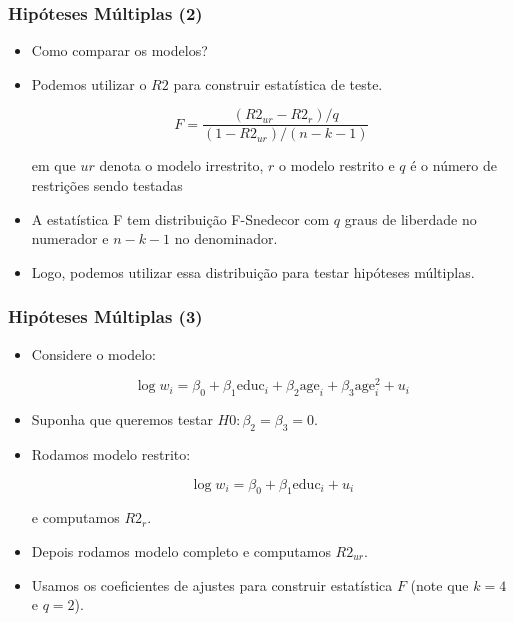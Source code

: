 \documentclass[10pt,slides,xcolor=pdftex,dvipsnames,table]{beamer}
\begin{document}

\begin{frame}[fragile]
	\frametitle{Hipóteses Múltiplas (2)}

\begin{itemize}\itemsep1.2em

\item Como comparar os modelos?

\item Podemos utilizar o $R2$ para construir estatística de teste.

$$ F = \frac{(R2_{ur} - R2_{r})/q}{(1- R2_{ur})/(n-k-1)} $$

em que $ur$ denota o modelo irrestrito, $r$ o modelo restrito e $q$ é o número de restrições sendo testadas 

\item A estatística F tem distribuição F-Snedecor com $q$ graus de liberdade no numerador e $n-k-1$ no denominador.

\item Logo, podemos utilizar essa distribuição para testar hipóteses múltiplas.

\end{itemize}

\end{frame}


\begin{frame}[fragile]
	\frametitle{Hipóteses Múltiplas (3)}

\begin{itemize}\itemsep1.2em

\item Considere o modelo: 

$$ \log w_i = \beta_0 + \beta_1 \text{educ}_i + \beta_2 \text{age}_i + \beta_3 \text{age}_i^2 + u_i $$

\item Suponha que queremos testar $H0: \beta_2 = \beta_3 = 0$. 

\item Rodamos modelo restrito: 

$$ \log w_i = \beta_0 + \beta_1 \text{educ}_i + u_i $$ 

e computamos $R2_r$.

\item Depois rodamos modelo completo e computamos $R2_{ur}$.

\item Usamos os coeficientes de ajustes para construir estatística $F$ (note que $k=4$ e $q = 2$).  

\end{itemize}

\end{frame}
\end{document}
